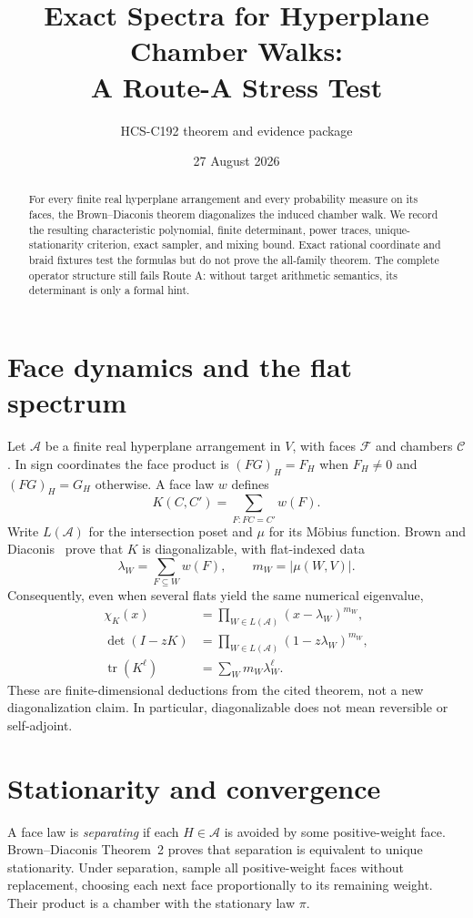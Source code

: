 \documentclass[10pt]{article}
\title{Exact Spectra for Hyperplane Chamber Walks:\\A Route-A Stress Test}
\author{HCS-C192 theorem and evidence package}
\date{27 August 2026}
\begin{document}
\maketitle
\begin{abstract}
For every finite real hyperplane arrangement and every probability measure on
its faces, the Brown--Diaconis theorem diagonalizes the induced chamber walk.
We record the resulting characteristic polynomial, finite determinant, power
traces, unique-stationarity criterion, exact sampler, and mixing bound.  Exact
rational coordinate and braid fixtures test the formulas but do not prove the
all-family theorem.  The complete operator structure still fails Route A:
without target arithmetic semantics, its determinant is only a formal hint.
\end{abstract}

\section{Face dynamics and the flat spectrum}
Let $\mathcal A$ be a finite real hyperplane arrangement in $V$, with faces
$\mathcal F$ and chambers $\mathcal C$.  In sign coordinates the face product is
$(FG)_H=F_H$ when $F_H\ne0$ and $(FG)_H=G_H$ otherwise.  A face law $w$ defines
\[
 K(C,C')=\sum_{F:FC=C'}w(F).
\]
Write $L(\mathcal A)$ for the intersection poset and $\mu$ for its M\"obius
function.  Brown and Diaconis~\cite[Theorem~1]{BD98} prove that $K$ is
diagonalizable, with flat-indexed data
\[
 \lambda_W=\sum_{F\subseteq W}w(F),\qquad
 m_W=|\mu(W,V)|.
\]
Consequently, even when several flats yield the same numerical eigenvalue,
\begin{align*}
 \chi_K(x)&=\prod_{W\in L(\mathcal A)}(x-\lambda_W)^{m_W},\\
 \det(I-zK)&=\prod_{W\in L(\mathcal A)}(1-z\lambda_W)^{m_W},\\
 \operatorname{tr}(K^\ell)&=\sum_Wm_W\lambda_W^\ell.
\end{align*}
These are finite-dimensional deductions from the cited theorem, not a new
diagonalization claim.  In particular, diagonalizable does not mean reversible
or self-adjoint.

\section{Stationarity and convergence}
A face law is \emph{separating} if each $H\in\mathcal A$ is avoided by some
positive-weight face.  Brown--Diaconis Theorem~2 proves that separation is
equivalent to unique stationarity.  Under separation, sample all
positive-weight faces without replacement, choosing each next face
proportionally to its remaining weight.  Their product is a chamber with the
stationary law $\pi$.
\end{document}
